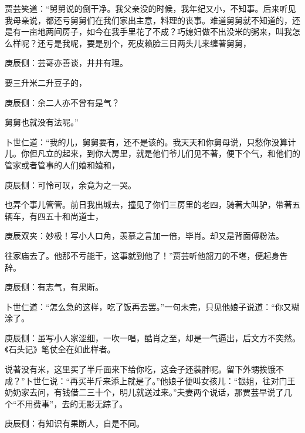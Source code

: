 \begin{parag}
    贾芸笑道：“舅舅说的倒干净。我父亲没的时候，我年纪又小，不知事。后来听见我母亲说，都还亏舅舅们在我们家出主意，料理的丧事。难道舅舅就不知道的，还是有一亩地两间房子，如今在我手里花了不成？巧媳妇做不出没米的粥来，叫我怎么样呢？还亏是我呢，要是别个，死皮赖脸三日两头儿来缠著舅舅，\begin{note}庚辰侧：芸哥亦善谈，井井有理。\end{note}要三升米二升豆子的，\begin{note}庚辰侧：余二人亦不曾有是气？\end{note}舅舅也就没有法呢。”
\end{parag}


\begin{parag}
    卜世仁道：“我的儿，舅舅要有，还不是该的。我天天和你舅母说，只愁你没算计儿。你但凡立的起来，到你大房里，就是他们爷儿们见不著，便下个气，和他们的管家或者管事的人们嬉和嬉和，\begin{note}庚辰侧：可怜可叹，余竟为之一哭。\end{note}也弄个事儿管管。前日我出城去，撞见了你们三房里的老四，骑著大叫驴，带著五辆车，有四五十和尚道士，\begin{note}庚辰双夹：妙极！写小人口角，羡慕之言加一倍，毕肖。却又是背面傅粉法。\end{note}往家庙去了。他那不亏能干，这事就到他了！”贾芸听他韶刀的不堪，便起身告辞。\begin{note}庚辰侧：有志气，有果断。\end{note}卜世仁道：“怎么急的这样，吃了饭再去罢。”一句未完，只见他娘子说道：“你又糊涂了。\begin{note}庚辰侧：虽写小人家涩细，一吹一唱，酷肖之至，却是一气逼出，后文方不突然。《石头记》笔仗全在如此样者。\end{note}说著没有米，这里买了半斤面来下给你吃，这会子还装胖呢。留下外甥挨饿不成？”卜世仁说：“再买半斤来添上就是了。”他娘子便叫女孩儿：“银姐，往对门王奶奶家去问，有钱借二三十个，明儿就送过来。”夫妻两个说话，那贾芸早说了几个“不用费事”，去的无影无踪了。\begin{note}庚辰侧：有知识有果断人，自是不同。\end{note}
\end{parag}



